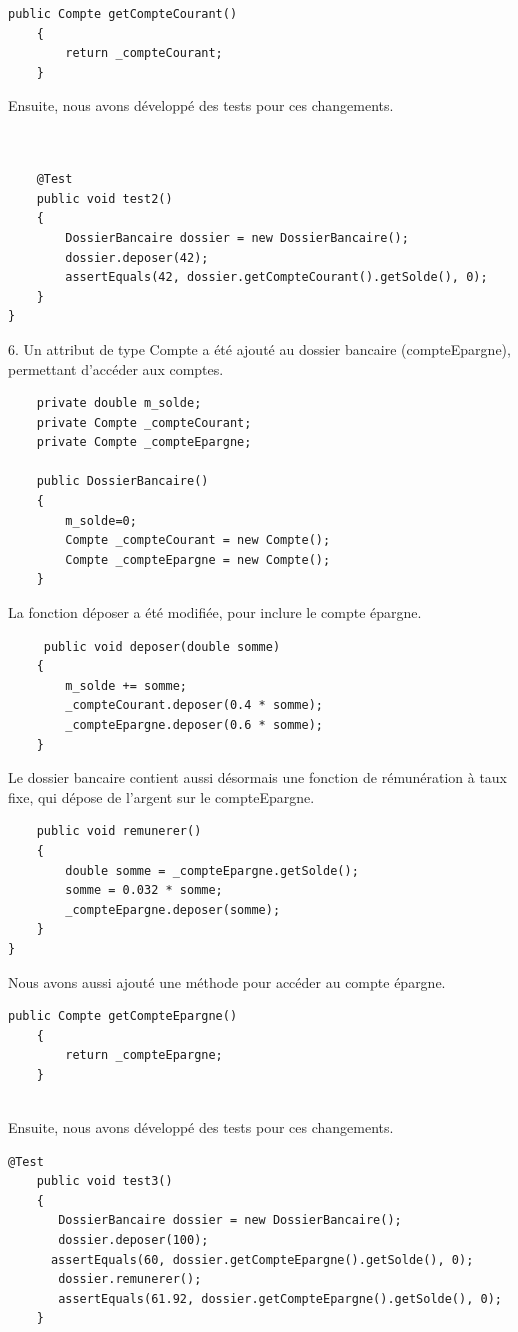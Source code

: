 \documentclass{article}
\begin{document}
\begin{lstlisting}
public Compte getCompteCourant()
    {
    	return _compteCourant;
    }
\end{lstlisting}


Ensuite, nous avons développé des tests pour ces changements.
\begin{lstlisting}

	
	@Test  
	public void test2() 
	{
		DossierBancaire dossier = new DossierBancaire();
		dossier.deposer(42);
		assertEquals(42, dossier.getCompteCourant().getSolde(), 0);		
	}
}
\end{lstlisting}


6.
Un attribut de type Compte a été ajouté au dossier bancaire (compteEpargne), permettant d'accéder aux comptes.
\begin{lstlisting}
    private double m_solde;
	private Compte _compteCourant;
	private Compte _compteEpargne;
	
    public DossierBancaire()
    {
    	m_solde=0;
    	Compte _compteCourant = new Compte();
    	Compte _compteEpargne = new Compte();
    }
\end{lstlisting}
La fonction déposer a été modifiée, pour inclure le compte épargne.
\begin{lstlisting}
     public void deposer(double somme)
    {
    	m_solde += somme;
    	_compteCourant.deposer(0.4 * somme);
    	_compteEpargne.deposer(0.6 * somme);
    }
\end{lstlisting}
Le dossier bancaire contient aussi désormais une fonction de rémunération à taux fixe, qui dépose de l'argent sur le compteEpargne.
\begin{lstlisting}
    public void remunerer()
    {
    	double somme = _compteEpargne.getSolde();
    	somme = 0.032 * somme;
    	_compteEpargne.deposer(somme);
    }
}
\end{lstlisting}
Nous avons aussi ajouté une méthode pour accéder au compte épargne.
\begin{lstlisting}
public Compte getCompteEpargne()
    {
    	return _compteEpargne;
    }
    
\end{lstlisting}

Ensuite, nous avons développé des tests pour ces changements.
\begin{lstlisting}
@Test  
	public void test3() 
	{
	   DossierBancaire dossier = new DossierBancaire();
	   dossier.deposer(100);
      assertEquals(60, dossier.getCompteEpargne().getSolde(), 0);	
	   dossier.remunerer();
	   assertEquals(61.92, dossier.getCompteEpargne().getSolde(), 0);	
	}
\end{lstlisting}
\end{document}
